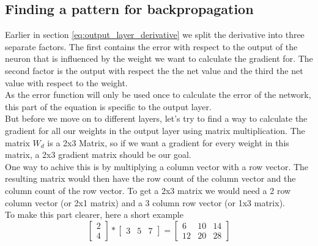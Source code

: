 \documentclass[11pt, halfparskip]{article}
\begin{document}
    \newpage
    \subsection{Finding a pattern for backpropagation}
    \label{sec:finding_a_pattern_for_backpropagation}
    Earlier in section \ref{eq:output_layer_derivative} we split the derivative into three separate factors. The first contains the error with respect to the output of the neuron that is
    influenced by the weight we want to calculate the gradient for. The second factor is the output with respect the the net value and the third the net value with respect to the weight.\\
    As the error function will only be used once to calculate the error of the network, this part of the equation is specific to the output layer.\\
    But before we move on to different layers, let's try to find a way to calculate the gradient for all our weights in the output layer using matrix multiplication. The matrix $W_d$ is a 2x3
    Matrix, so if we want a gradient for every weight in this matrix, a 2x3 gradient matrix should be our goal.\\
    One way to achive this is by multiplying a column vector with a row vector. The resulting matrix would then have the row count of the column vector and the column count of the row
    vector. To get a 2x3 matrix we would need a 2 row column vector (or 2x1 matrix) and a 3 column row vector (or 1x3 matrix).\\
    To make this part clearer, here a short example
    \begin{equation}
    \label{eq:column_times_row_example}
    	\begin{bmatrix}
    		2\\
    		4
    	\end{bmatrix}
    	*
    	\begin{bmatrix}
    		3 & 5 & 7
    	\end{bmatrix}
    	=
    	\begin{bmatrix}
    		6 & 10 & 14\\
    		12 & 20 & 28
    	\end{bmatrix}
    \end{equation}
    
\end{document}

